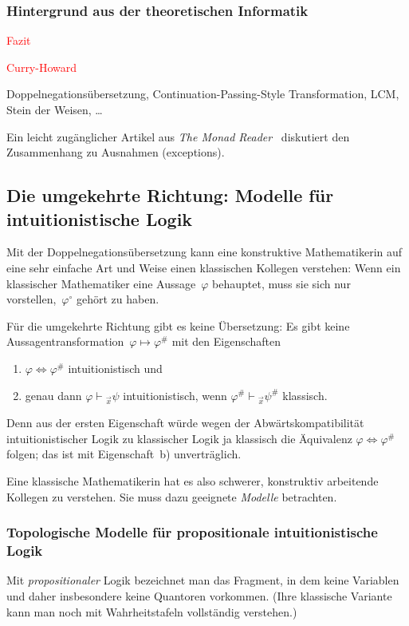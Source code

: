 \documentclass[a4paper,ngerman,12pt]{scrartcl}
\theoremstyle{definition}
\theoremstyle{plain}
\theoremstyle{remark}
\newcommand{\seq}[1]{\mathrel{\vdash\!\!\!_{#1}}}
\renewcommand{\_}{\mathpunct{.}\,}
\newcommand{\?}{\,{:}\,}
\newcommand{\XXX}[1]{\textcolor{red}{#1}}
\begin{document}
\subsubsection*{Hintergrund aus der theoretischen Informatik}

\XXX{Fazit}

\XXX{Curry-Howard}

Doppelnegationsübersetzung, Continuation-Passing-Style Transformation,
LCM, Stein der Weisen, \ldots

Ein leicht zugänglicher Artikel aus \emph{The Monad
Reader}~\cite{sigfpe:adventures} diskutiert den Zusammenhang zu Ausnahmen
(exceptions).


\subsection{Die umgekehrte Richtung: Modelle für intuitionistische Logik}

Mit der Doppelnegationsübersetzung kann eine konstruktive Mathematikerin auf
eine sehr einfache Art und Weise einen klassischen Kollegen verstehen: Wenn ein
klassischer Mathematiker eine Aussage~$\varphi$ behauptet, muss sie sich nur
vorstellen,~$\varphi^\circ$ gehört zu haben.

Für die umgekehrte Richtung gibt es keine Übersetzung: Es gibt keine
Aussagentransformation~$\varphi \mapsto \varphi^\#$ mit den Eigenschaften
\begin{enumerate}
\item $\varphi \Longleftrightarrow \varphi^\#$ intuitionistisch und
\item genau dann $\varphi \seq{\vec x} \psi$ intuitionistisch, wenn $\varphi^\#
\seq{\vec x} \psi^\#$ klassisch.
\end{enumerate}
Denn aus der ersten Eigenschaft würde wegen der Abwärtskompatibilität
intuitionistischer Logik zu klassischer Logik ja klassisch die Äquivalenz $\varphi \Leftrightarrow
\varphi^\#$ folgen; das ist mit Eigenschaft~b) unverträglich.

Eine klassische Mathematikerin hat es also schwerer, konstruktiv arbeitende
Kollegen zu verstehen. Sie muss dazu geeignete \emph{Modelle} betrachten.


\subsubsection*{Topologische Modelle für propositionale intuitionistische
Logik}

Mit \emph{propositionaler} Logik bezeichnet man das Fragment, in dem keine
Variablen und daher insbesondere keine Quantoren vorkommen. (Ihre klassische
Variante kann man noch mit Wahrheitstafeln vollständig verstehen.)
\end{document}
